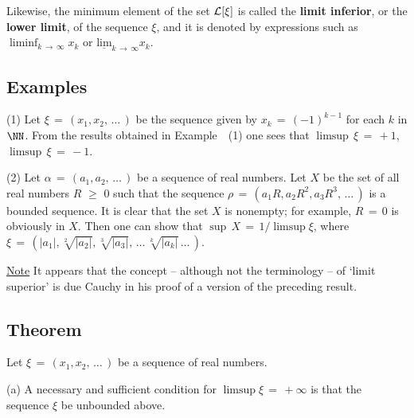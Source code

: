         Likewise, the minimum element of the set ${\cal L}[{\xi}]$ is called the {\bf limit inferior}, or the {\bf lower limit}, of the sequence ${\xi}$,
    and it is denoted by expressions such as ${\displaystyle \liminf_{k \,{\rightarrow}\, {\infty}} x_{k}}$ or $\underline{\mbox{lim}}_{k \,{\rightarrow}\, {\infty}} x_{k}$.

\V

            \subsection{\small{\bf Examples}}
            \label{ExamC50.160}

\V

\hspace*{\parindent}(1) Let ${\xi} \,=\, (x_{1}, x_{2},\,{\ldots}\,)$ be the sequence given by $x_{k} \,=\, (-1)^{k-1}$ for each $k$ in ${\NN}$.
    From the results obtained in Example~~(1) one sees that $\limsup\,{\xi} \,=\, +1$, $\limsup\,{\xi} \,=\, -1$.

\V

        (2) Let ${\alpha} \,=\, (a_{1}, a_{2},\,{\ldots}\,)$ be a sequence of real numbers.
    Let $X$ be the set of all real numbers $R\,\,{\geq}\,\,0$ such that the sequence ${\rho} \,=\, (a_{1}R, a_{2}R^{2}, a_{3}R^{3}, \,{\ldots}\,)$
    is a bounded sequence.
    It is clear that the set $X$ is nonempty; for example, $R \,=\, 0$ is obviously in $X$.
    Then one can show that ${\sup}\,X \,=\, 1/\limsup {\xi}$, where ${\xi}\,=\, (|a_{1}|, \sqrt[2]{|a_{2}|}, \sqrt[3]{|a_{3}|}, \,{\ldots}\,\sqrt[k]{|a_{k}|} \,{\ldots}\,)$.

        \underline{Note} It appears that the concept -- although not the terminology -- of `limit superior' is due Cauchy in his proof of a version of the preceding result.



\V


            \subsection{\small{\bf Theorem}}
            \label{ThmC50.170}

        Let ${\xi} \,=\, (x_{1},x_{2},\,{\ldots}\,)$ be a sequence of real numbers.

\V

        (a) A necessary and sufficient condition for $\limsup {\xi} \,=\, +{\infty}$ is that the sequence ${\xi}$ be unbounded above.
    
